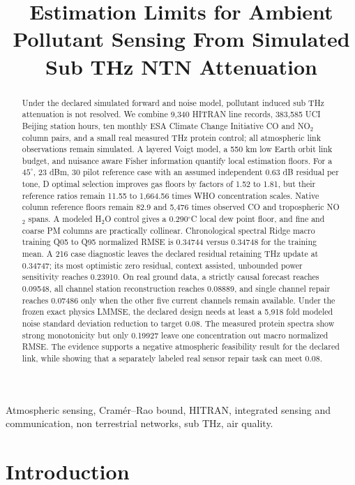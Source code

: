 \documentclass[conference]{IEEEtran}
\title{Estimation Limits for Ambient Pollutant Sensing From Simulated Sub THz NTN Attenuation}
\author{
\IEEEauthorblockN{Guillem Moreno Garcia}
\IEEEauthorblockA{
Universitat Polit\`ecnica de Catalunya\\
Email: guillem.moreno.garcia@estudiantat.upc.edu}
}
\begin{document}
\maketitle

\begin{abstract}
Under the declared simulated forward and noise model, pollutant induced sub THz attenuation is not resolved. We combine 9,340 HITRAN line records, 383,585 UCI Beijing station hours, ten monthly ESA Climate Change Initiative CO and NO$_2$ column pairs, and a small real measured THz protein control; all atmospheric link observations remain simulated. A layered Voigt model, a 550 km low Earth orbit link budget, and nuisance aware Fisher information quantify local estimation floors. For a $45^\circ$, 23 dBm, 30 pilot reference case with an assumed independent 0.63 dB residual per tone, D optimal selection improves gas floors by factors of 1.52 to 1.81, but their reference ratios remain 11.55 to 1,664.56 times WHO concentration scales. Native column reference floors remain 82.9 and 5,476 times observed CO and tropospheric NO$_2$ spans. A modeled H$_2$O control gives a 0.290$^\circ$C local dew point floor, and fine and coarse PM columns are practically collinear. Chronological spectral Ridge macro training Q05 to Q95 normalized RMSE is 0.34744 versus 0.34748 for the training mean. A 216 case diagnostic leaves the declared residual retaining THz update at 0.34747; its most optimistic zero residual, context assisted, unbounded power sensitivity reaches 0.23910. On real ground data, a strictly causal forecast reaches 0.09548, all channel station reconstruction reaches 0.08889, and single channel repair reaches 0.07486 only when the other five current channels remain available. Under the frozen exact physics LMMSE, the declared design needs at least a 5,918 fold modeled noise standard deviation reduction to target 0.08. The measured protein spectra show strong monotonicity but only 0.19927 leave one concentration out macro normalized RMSE. The evidence supports a negative atmospheric feasibility result for the declared link, while showing that a separately labeled real sensor repair task can meet 0.08.
\end{abstract}

\begin{IEEEkeywords}
Atmospheric sensing, Cram\'er--Rao bound, HITRAN, integrated sensing and communication, non terrestrial networks, sub THz, air quality.
\end{IEEEkeywords}

\section{Introduction}
\end{document}
